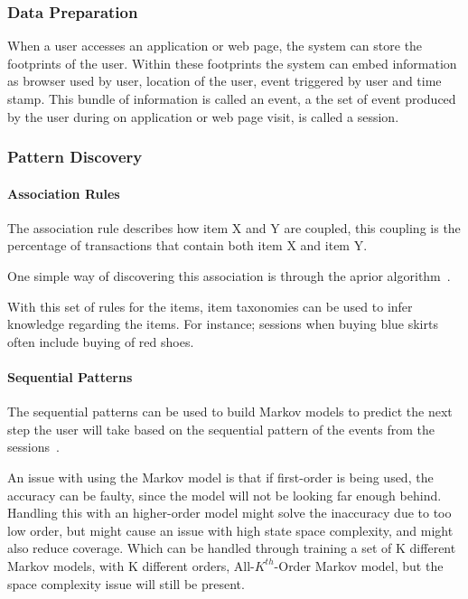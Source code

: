     \subsubsection{Data Preparation} %
        \label{par:Data_Preparation}
        When a user accesses an application or web page, the system can store the footprints of the user.
        Within these footprints the system can embed information as browser used by user, location of the user, event triggered by user and time stamp.
        This bundle of information is called an event, a the set of event produced by the user during on application or web page visit, is called a session.

    \subsubsection{Pattern Discovery} %
        \label{par:pattern_discovery}
        \paragraph{Association Rules} %
            \label{subp:association_rules}
            The association rule describes how item X and Y are coupled, this coupling is the percentage of transactions that contain both item X and item Y.

            One simple way of discovering this association is through the aprior algorithm~\cite{Agrawal:1994:FAM:645920.672836}.

            With this set of rules for the items, item taxonomies can be used to infer knowledge regarding the items.
            For instance; sessions when buying blue skirts often include buying of red shoes.
        \paragraph{Sequential Patterns} %
        \label{subp:sequential_patterns}
            The sequential patterns can be used to build Markov models to predict the next step the user will take based on the sequential pattern of the events from the sessions~\cite{Deshpande:2004:SMM:990301.990304}.

            An issue with using the Markov model is that if first-order is being used, the accuracy can be faulty, since the model will not be looking far enough behind.
            Handling this with an higher-order model might solve the inaccuracy due to too low order, but might cause an issue with high state space complexity, and might also reduce coverage.
            Which can be handled through training a set of K different Markov models, with K different orders, All-$K^{th}$-Order Markov model, but the space complexity issue will still be present.

